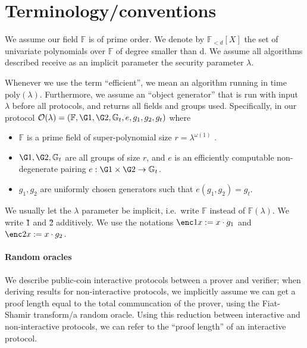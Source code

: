 \documentclass[11pt]{article}
\numberwithin{figure}{section} %
\newcommand{\poly}{\ensuremath{\mathrm{poly}(\lambda)}\xspace}
\newcommand{\Gt}{\ensuremath{{\mathbb G}_t}\xspace}
\newcommand{\F}{\ensuremath{\mathbb F}\xspace}
\newcommand{\defeq}{:=}
\newcommand{\polysofdeg}[1]{\ensuremath{\F_{< #1}[X]}\xspace}
\begin{document}
\section{Terminology/conventions}\label{sec:terminology}
We assume our field \F is of prime order.
We denote by \polysofdeg{d} the set of univariate polynomials over \F of degree smaller than d. 
We assume all algorithms described receive as an implicit parameter the security parameter $\lambda$.

Whenever we use the term “efficient”, we mean an algorithm running in time \poly. Furthermore,
we assume an “object generator” \obgen that is run with input $\lambda$ before all protocols, and returns all fields and groups used. Specifically, in our protocol $\obgen(\lambda) = (\F, \G1, \G2, \Gt, e, g_1, g_2,g_t)$ where
\begin{itemize}
\item \F is a prime field of super-polynomial size $r = \lambda^{\omega(1)}$
.
\item $\G1,\G2,\Gt$ are all groups of size $r$, and $e$ is an efficiently computable non-degenerate pairing
$e : \G1 \times \G2 \to \Gt$.
\item $g_1,g_2$ are uniformly chosen generators such that $e(g_1, g_2) = g_t$.
\end{itemize}
We usually let the $\lambda$ parameter be implicit, i.e.\ write \F instead of $\F(\lambda)$.
We write \G1 and \G2 additively. We use the notations $\enc1{x}\defeq x\cdot g_1$ and $\enc2{x}\defeq x\cdot g_2$.




\paragraph{Random oracles}
We describe public-coin interactive protocols between a prover and verifier; when deriving results for non-interactive protocols,
we implicitly assume we can get a proof length equal to the total communcation of the prover, using the Fiat-Shamir transform/a random oracle. Using this reduction between interactive and non-interactive protocols, we can refer to the ``proof length'' of an interactive protocol.
\end{document}
